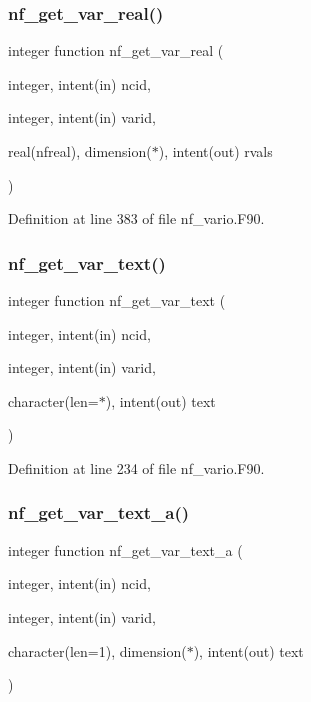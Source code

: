 \subsubsection{\texorpdfstring{nf\+\_\+get\+\_\+var\+\_\+real()}{nf\_get\_var\_real()}}
{\footnotesize\ttfamily integer function nf\+\_\+get\+\_\+var\+\_\+real (\begin{DoxyParamCaption}\item[{integer, intent(in)}]{ncid,  }\item[{integer, intent(in)}]{varid,  }\item[{real(nfreal), dimension($\ast$), intent(out)}]{rvals }\end{DoxyParamCaption})}



Definition at line 383 of file nf\+\_\+vario.\+F90.

\mbox{\label{nf__vario_8F90_ac95762460f981c284b4f1e5fc705cbbd}} 
\subsubsection{\texorpdfstring{nf\+\_\+get\+\_\+var\+\_\+text()}{nf\_get\_var\_text()}}
{\footnotesize\ttfamily integer function nf\+\_\+get\+\_\+var\+\_\+text (\begin{DoxyParamCaption}\item[{integer, intent(in)}]{ncid,  }\item[{integer, intent(in)}]{varid,  }\item[{character(len=$\ast$), intent(out)}]{text }\end{DoxyParamCaption})}



Definition at line 234 of file nf\+\_\+vario.\+F90.

\mbox{\label{nf__vario_8F90_a9d1f932f41722534e26250b4fa2153b3}} 
\subsubsection{\texorpdfstring{nf\+\_\+get\+\_\+var\+\_\+text\+\_\+a()}{nf\_get\_var\_text\_a()}}
{\footnotesize\ttfamily integer function nf\+\_\+get\+\_\+var\+\_\+text\+\_\+a (\begin{DoxyParamCaption}\item[{integer, intent(in)}]{ncid,  }\item[{integer, intent(in)}]{varid,  }\item[{character(len=1), dimension($\ast$), intent(out)}]{text }\end{DoxyParamCaption})}



